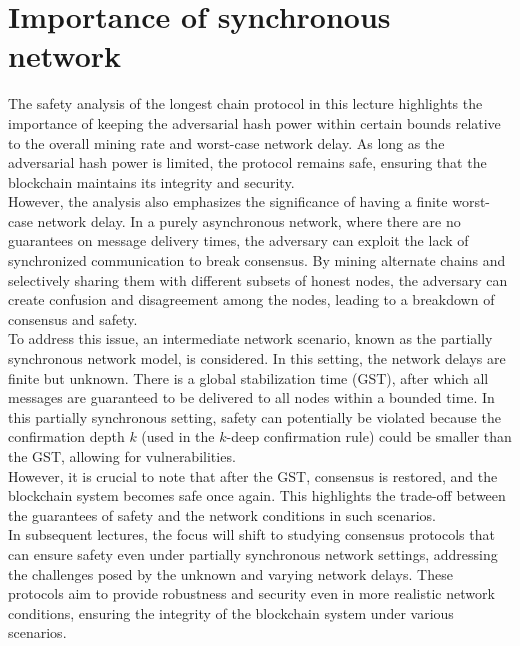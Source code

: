 \section{Importance of synchronous network}
The safety analysis of the longest chain protocol in this lecture highlights the importance of keeping the adversarial hash power within certain bounds relative to the overall mining rate and worst-case network delay. As long as the adversarial hash power is limited, the protocol remains safe, ensuring that the blockchain maintains its integrity and security.\\
However, the analysis also emphasizes the significance of having a finite worst-case network delay. In a purely asynchronous network, where there are no guarantees on message delivery times, the adversary can exploit the lack of synchronized communication to break consensus. By mining alternate chains and selectively sharing them with different subsets of honest nodes, the adversary can create confusion and disagreement among the nodes, leading to a breakdown of consensus and safety.\\
To address this issue, an intermediate network scenario, known as the partially synchronous network model, is considered. In this setting, the network delays are finite but unknown. There is a global stabilization time (GST), after which all messages are guaranteed to be delivered to all nodes within a bounded time. In this partially synchronous setting, safety can potentially be violated because the confirmation depth $k$ (used in the $k$-deep confirmation rule) could be smaller than the GST, allowing for vulnerabilities.\\
However, it is crucial to note that after the GST, consensus is restored, and the blockchain system becomes safe once again. This highlights the trade-off between the guarantees of safety and the network conditions in such scenarios.\\
In subsequent lectures, the focus will shift to studying consensus protocols that can ensure safety even under partially synchronous network settings, addressing the challenges posed by the unknown and varying network delays. These protocols aim to provide robustness and security even in more realistic network conditions, ensuring the integrity of the blockchain system under various scenarios.
